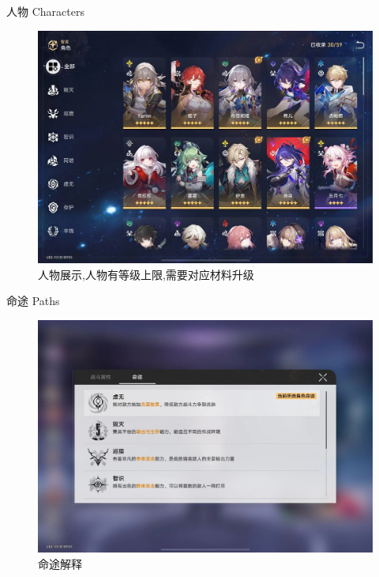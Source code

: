 \documentclass{beamer}
\begin{document}
\begin{frame}{人物 Characters}
    \begin{figure}   
        \centering
        \includegraphics[width=0.8\linewidth]{img/ebba9a3133c78f8cd6f6b04e754b4b4.jpg} 
        \caption{人物展示,人物有等级上限,需要对应材料升级}
        \label{Forward and Reverse Process}
        \end{figure}
\end{frame}

\begin{frame}{命途 Paths}
    \begin{figure}   
        \centering
        \includegraphics[width=0.8\linewidth]{img/ecf27237569fe3ffe1d582150f50fe1.jpg} 
        \caption{命途解释}
        \label{Forward and Reverse Process}
        \end{figure}
\end{frame}
\end{document}
